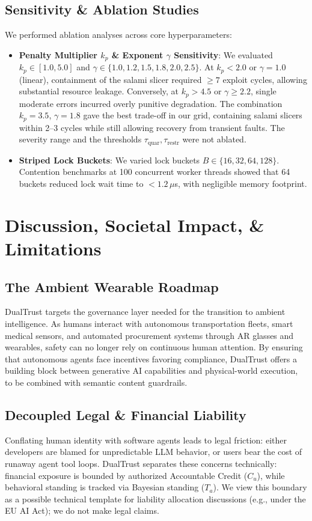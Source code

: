 \documentclass[manuscript, screen, review]{jair}
\begin{document}
\subsection{Sensitivity \& Ablation Studies}
We performed ablation analyses across core hyperparameters:
\begin{itemize}[leftmargin=12pt, topsep=2pt, itemsep=1pt]
\item \textbf{Penalty Multiplier $k_p$ \& Exponent $\gamma$ Sensitivity}: We evaluated $k_p \in [1.0, 5.0]$ and $\gamma \in \{1.0, 1.2, 1.5, 1.8, 2.0, 2.5\}$. At $k_p < 2.0$ or $\gamma = 1.0$ (linear), containment of the salami slicer required $\ge 7$ exploit cycles, allowing substantial resource leakage. Conversely, at $k_p > 4.5$ or $\gamma \ge 2.2$, single moderate errors incurred overly punitive degradation. The combination $k_p = 3.5$, $\gamma = 1.8$ gave the best trade-off in our grid, containing salami slicers within 2--3 cycles while still allowing recovery from transient faults. The severity range and the thresholds $\tau_{\text{quar}}, \tau_{\text{restr}}$ were not ablated.
\item \textbf{Striped Lock Buckets}: We varied lock buckets $B \in \{16, 32, 64, 128\}$. Contention benchmarks at 100 concurrent worker threads showed that 64 buckets reduced lock wait time to $<1.2\,\mu$s, with negligible memory footprint.
\end{itemize}

\section{Discussion, Societal Impact, \& Limitations}
\label{sec:discussion}

\subsection{The Ambient Wearable Roadmap}
DualTrust targets the governance layer needed for the transition to ambient intelligence. As humans interact with autonomous transportation fleets, smart medical sensors, and automated procurement systems through AR glasses and wearables, safety can no longer rely on continuous human attention. By ensuring that autonomous agents face incentives favoring compliance, DualTrust offers a building block between generative AI capabilities and physical-world execution, to be combined with semantic content guardrails.

\subsection{Decoupled Legal \& Financial Liability}
Conflating human identity with software agents leads to legal friction: either developers are blamed for unpredictable LLM behavior, or users bear the cost of runaway agent tool loops. DualTrust separates these concerns technically: financial exposure is bounded by authorized Accountable Credit ($C_u$), while behavioral standing is tracked via Bayesian standing ($T_a$). We view this boundary as a possible technical template for liability allocation discussions (e.g., under the EU AI Act); we do not make legal claims.
\end{document}
